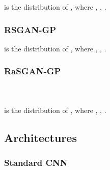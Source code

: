 \documentclass{article}
\begin{document}
 

 is the distribution of , where , , .

\subsubsection{RSGAN-GP}



 is the distribution of , where , , .


\subsubsection{RaSGAN-GP}

 

 \\  \\
 is the distribution of , where , , .

\subsection{Architectures}

\subsubsection{Standard CNN}
\end{document}
